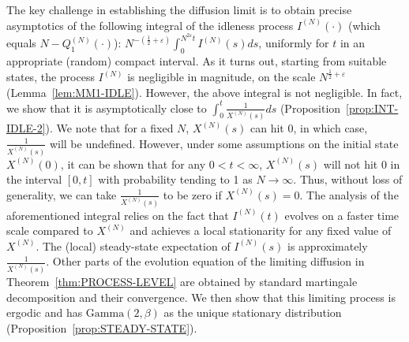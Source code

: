 \documentclass[11pt, reqno]{article}
\numberwithin{equation}{section}
\numberwithin{theorem}{section}
\newcommand{\newGamma}{\mathrm{Gamma}}
\begin{document}
The key challenge in establishing the diffusion limit is to obtain precise asymptotics of the following integral of the idleness process $I^{(N)}(\cdot)$ (which equals $N - Q_1^{(N)}(\cdot)$): $N^{-(\frac{1}{2}+\varepsilon)}\int_0^{N^{2\varepsilon}t}I^{(N)}(s)ds$, uniformly for $t$ in an appropriate (random) compact interval.
As it turns out, starting from suitable states, the process $I^{(N)}$ is negligible in magnitude, on the scale $N^{\frac{1}{2}+\varepsilon}$ (Lemma~\ref{lem:MM1-IDLE}).
However, the above integral is not negligible. 
In fact, we show that it is asymptotically close to $\int_0^t \frac{1}{X^{(N)}(s)}ds$ (Proposition~\ref{prop:INT-IDLE-2}). 
We note that for a fixed $N$, $X^{(N)}(s)$ can hit 0, in which case, $\frac{1}{X^{(N)}(s)}$ will be undefined. 
However, under some assumptions on the initial state $X^{(N)}(0)$, it can be shown that for any $0<t<\infty$, $X^{(N)}(s)$ will not hit 0 in the interval $[0,t]$ with probability tending to 1 as $N\rightarrow\infty$. Thus, without loss of generality, we can take $\frac{1}{X^{(N)}(s)}$ to be zero if $X^{(N)}(s)=0$.
The analysis of the aforementioned integral relies on the fact that $I^{(N)}(t)$ evolves on a faster time scale compared to $X^{(N)}$ and achieves a local stationarity for any fixed value of $X^{(N)}$.
The (local) steady-state expectation of $I^{(N)}(s)$ is approximately $\frac{1}{X^{(N)}(s)}$.
Other parts of the evolution equation of the limiting diffusion in Theorem~\ref{thm:PROCESS-LEVEL} are obtained by standard martingale decomposition and their convergence.
We then show that this limiting process is ergodic and has $\newGamma(2, \beta)$ as the unique stationary distribution (Proposition~\ref{prop:STEADY-STATE}).
\end{document}
